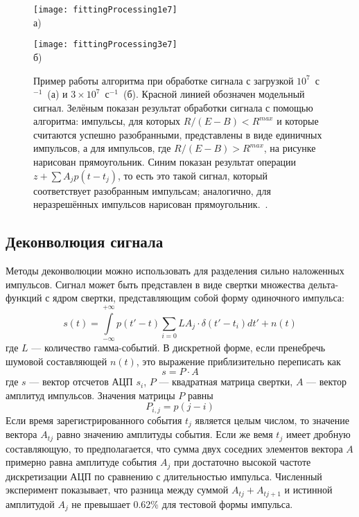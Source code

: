 \begin{figure}[ht]
    \begin{minipage}[b][][b]{0.95\linewidth}\centering
        \texttt{[image: fittingProcessing1e7]} \\ а)
    \end{minipage}
    \vfill
    \begin{minipage}[b][][b]{0.95\linewidth}\centering
        \texttt{[image: fittingProcessing3e7]} \\ б)
    \end{minipage}
    \vspace{5mm}
    \caption{ Пример работы алгоритма при обработке сигнала с загрузкой $10^7$~с${}^{-1}$~(а) и $3 \times 10^7$~с${}^{-1}$~(б). Красной линией обозначен модельный сигнал. Зелёным показан результат обработки сигнала с помощью алгоритма: импульсы, для которых $R/(E-B)<R^{max}$ и которые считаются успешно разобранными, представлены в виде единичных импульсов, а для импульсов, где $R/(E-B)>R^{max}$, на рисунке нарисован прямоугольник. Синим показан результат операции $z + \sum A_j p(t - t_j)$, то есть это такой сигнал, который соответствует разобранным импульсам; аналогично, для неразрешённых импульсов нарисован прямоугольник.~\cite{Khilkevitch2020}. }
    \label{fig:FittingProcessing}
\end{figure}


\subsection{Деконволюция сигнала}

Методы деконволюции можно использовать для разделения сильно наложенных импульсов. Сигнал может быть представлен в виде свертки множества дельта-функций с ядром свертки, представляющим собой форму одиночного импульса: 
\begin{equation}
  \label{eq:SignalAsConvolution}
  s(t) = \int \limits_{-\infty}^{+\infty} p( t' - t ) \sum \limits_{i=0}{L} A_j \cdot \delta(t' - t_i) dt' + n(t)
\end{equation}
где $L$ --- количество гамма-событий. В дискретной форме, если пренебречь шумовой составляющей $n(t)$, это выражение приблизительно переписать как 
\begin{equation}
  s = P \cdot A
\end{equation}
где $s$ --- вектор отсчетов АЦП $s_i$, $P$ --- квадратная матрица свертки, $A$ --- вектор амплитуд импульсов. Значения матрицы $P$ равны
\begin{equation*}
  P_{i,j} = p( j - i )
\end{equation*}
Если время зарегистрированного события $t_j$ является целым числом, то значение вектора $A_{tj}$ равно значению амплитуды события. Если же вемя $t_j$ имеет дробную составляющую, то предполагается, что сумма двух соседних элементов вектора $A$ примерно равна амплитуде события $A_j$ при достаточно высокой частоте дискретизации АЦП по сравнению с длительностью импульса. Численный эксперимент показывает, что разница между суммой $A_{tj} + A_{tj+1}$ и истинной амплитудой $A_j$ не превышает 0.62\% для тестовой формы импульса.

